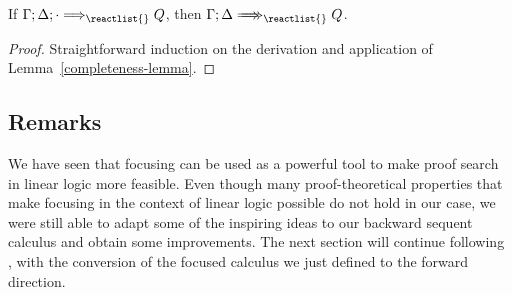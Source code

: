 \begin{theorem}[Completeness]
  If $\ztriseq{\Gamma}{\Delta}{\cdot}{\reactlist{}}{Q}$, then
  $\zbneuseq{\Gamma}{\Delta}{\reactlist{}}{Q}$.
\end{theorem}
\begin{proof}
  Straightforward induction on the derivation and application of
  Lemma~\ref{completeness-lemma}.
\end{proof}

\subsection{Remarks}

We have seen that focusing can be used as a powerful tool to make proof search
in linear logic more feasible. Even though many proof-theoretical properties
that make focusing in the context of linear logic possible do not hold in our
case, we were still able to adapt some of the inspiring ideas to our backward
sequent calculus and obtain some improvements. The next section will continue
following \cite{chaudhuri-thesis}, with the conversion of the focused calculus
we just defined to the forward direction.

